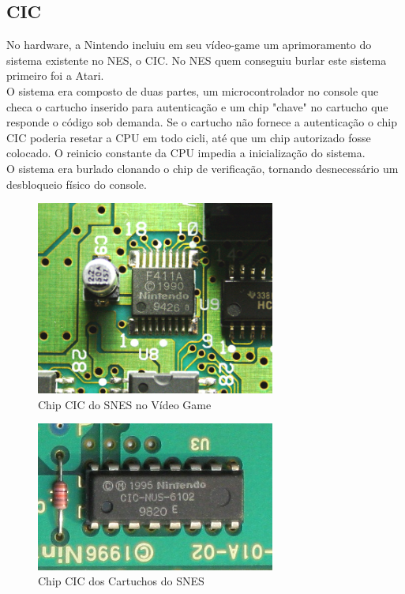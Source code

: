 \documentclass[paper=a4, fontsize=11pt]{scrartcl}	%
\numberwithin{equation}{section}															%
\numberwithin{figure}{section}																%
\numberwithin{table}{section}																%
\begin{document}
\subsection*{CIC}
No hardware, a Nintendo incluiu em seu vídeo-game um aprimoramento do sistema existente no NES, o CIC. No NES quem conseguiu burlar este sistema primeiro foi a Atari.\\
O sistema era composto de duas partes, um microcontrolador no console que checa o cartucho inserido para autenticação e um chip "chave" no cartucho que responde o código sob demanda. Se o cartucho não fornece a autenticação o chip CIC poderia resetar a CPU em todo cicli, até que um chip autorizado fosse colocado. O reinicio constante da CPU impedia a inicialização do sistema.\\
O sistema era burlado clonando o chip de verificação, tornando desnecessário um desbloqueio físico do console.
\begin{figure}[h!]
	\centering
    \includegraphics[width=0.7\textwidth]{img/snescicvg}
    \caption{Chip CIC do SNES no Vídeo Game}
\end{figure}
\begin{figure}[h!]
	\centering
    \includegraphics[width=0.7\textwidth]{img/snesciccart}
    \caption{Chip CIC dos Cartuchos do SNES}
\end{figure}
\end{document}
